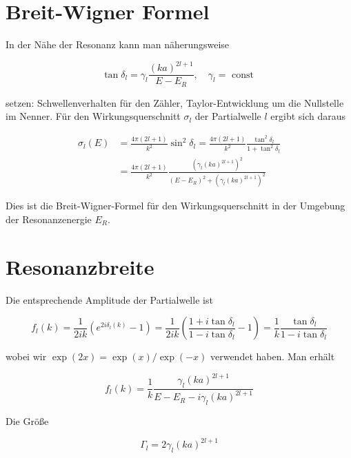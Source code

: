 \documentclass[10pt, letterpaper]{article}
\begin{document}
\section*{Breit-Wigner Formel}
In der Nähe der Resonanz kann man näherungsweise

$$
\tan \delta_{l}=\gamma_{l} \frac{(k a)^{2 l+1}}{E-E_{R}}, \quad \gamma_{l}=\text { const }
$$

setzen: Schwellenverhalten für den Zähler, Taylor-Entwicklung um die Nullstelle im Nenner. Für den Wirkungsquerschnitt $\sigma_{l}$ der Partialwelle $l$ ergibt sich daraus

$$
\begin{aligned}
\sigma_{l}(E) & =\frac{4 \pi(2 l+1)}{k^{2}} \sin ^{2} \delta_{l}=\frac{4 \pi(2 l+1)}{k^{2}} \frac{\tan ^{2} \delta_{l}}{1+\tan ^{2} \delta_{l}} \\
& =\frac{4 \pi(2 l+1)}{k^{2}} \frac{\left(\gamma_{l}(k a)^{2 l+1}\right)^{2}}{\left(E-E_{R}\right)^{2}+\left(\gamma_{l}(k a)^{2 l+1}\right)^{2}}
\end{aligned}
$$

Dies ist die Breit-Wigner-Formel für den Wirkungsquerschnitt in der Umgebung der Resonanzenergie $E_{R}$.

\section*{Resonanzbreite}
Die entsprechende Amplitude der Partialwelle ist

$$
f_{l}(k)=\frac{1}{2 i k}\left(e^{2 i \delta_{l}(k)}-1\right)=\frac{1}{2 i k}\left(\frac{1+i \tan \delta_{l}}{1-i \tan \delta_{l}}-1\right)=\frac{1}{k} \frac{\tan \delta_{l}}{1-i \tan \delta_{l}}
$$

wobei wir $\exp (2 x)=\exp (x) / \exp (-x)$ verwendet haben. Man erhält

$$
f_{l}(k)=\frac{1}{k} \frac{\gamma_{l}(k a)^{2 l+1}}{E-E_{R}-i \gamma_{l}(k a)^{2 l+1}}
$$

Die Größe

$$
\Gamma_{l}=2 \gamma_{l}(k a)^{2 l+1}
$$
\end{document}
